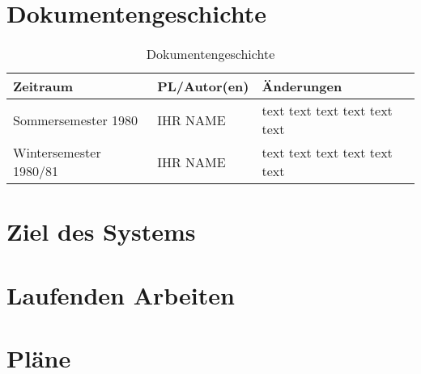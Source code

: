 \section{Dokumentengeschichte}
\begin{table}[h]
 \begin{tabular}{|l|l|p{4cm}|}
 \hline
 Zeitraum & PL/Autor(en) & Änderungen \\
 \hline
 Sommersemester 1980 & IHR NAME & 
text \newline 
text \newline 
text \newline 
text \newline 
text \newline 
text \newline 
 
  \\
 \hline
 Wintersemester 1980/81 & IHR NAME & 
text \newline 
text \newline 
text \newline 
text \newline 
text \newline 
text \newline 
 
  \\
 \hline
 
 
 \end{tabular}
 \caption{Dokumentengeschichte}
 \end{table}

\section{Ziel des Systems}
\section{Laufenden Arbeiten}
\section{Pläne}

